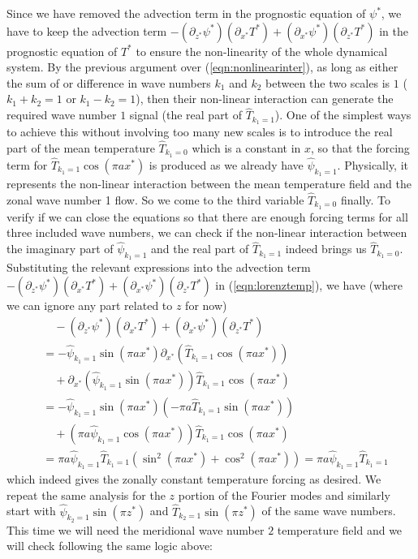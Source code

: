 Since we have removed the advection term in the prognostic equation of $\psi^*$, we have to keep the advection term $- (\partial_{z^*} \psi^*)(\partial_{x^*} T^*) + (\partial_{x^*} \psi^*)(\partial_{z^*} T^*)$ in the prognostic equation of $T^*$ to ensure the non-linearity of the whole dynamical system. By the previous argument over (\ref{eqn:nonlinearinter}), as long as either the sum of or difference in wave numbers $k_1$ and $k_2$ between the two scales is $1$ ($k_1 + k_2 = 1$ or $k_1 - k_2 = 1$), then their non-linear interaction can generate the required wave number $1$ signal (the real part of $\hat{T}_{k_1 = 1}$). One of the simplest ways to achieve this without involving too many new scales is to introduce the real part of the mean temperature $\hat{T}_{k_1 = 0}$ which is a constant in $x$, so that the forcing term for $\hat{T}_{k_1 = 1} \cos(\pi ax^*)$ is produced as we already have $\hat{\psi}_{k_1 = 1}$. Physically, it represents the non-linear interaction between the mean temperature field and the zonal wave number 1 flow. So we come to the third variable $\hat{T}_{k_1 = 0}$ finally. To verify if we can close the equations so that there are enough forcing terms for all three included wave numbers, we can check if the non-linear interaction between the imaginary part of $\hat{\psi}_{k_1 = 1}$ and the real part of $\hat{T}_{k_1 = 1}$ indeed brings us $\hat{T}_{k_1 = 0}$. Substituting the relevant expressions into the advection term $-(\partial_{z^*} \psi^*)(\partial_{x^*} T^*) + (\partial_{x^*} \psi^*)(\partial_{z^*} T^*)$ in (\ref{eqn:lorenztemp}), we have (where we can ignore any part related to $z$ for now)
\begin{align*}
&\quad -(\partial_{z^*} \psi^*)(\partial_{x^*} T^*) + (\partial_{x^*} \psi^*)(\partial_{z^*} T^*) \\
&= -\hat{\psi}_{k_1 = 1} \sin(\pi a x^*) \partial_{x^*} (\hat{T}_{k_1 = 1} \cos(\pi a x^*)) \\
&\quad + \partial_{x^*}(\hat{\psi}_{k_1 = 1} \sin(\pi a x^*))\hat{T}_{k_1 = 1} \cos(\pi a x^*) \\
&= -\hat{\psi}_{k_1 = 1} \sin(\pi a x^*)(-\pi a\hat{T}_{k_1 = 1}\sin(\pi a x^*)) \\
&\quad + (\pi a\hat{\psi}_{k_1 = 1}\cos(\pi a x^*)) \hat{T}_{k_1 = 1} \cos(\pi a x^*) \\
&= \pi a \hat{\psi}_{k_1 = 1}\hat{T}_{k_1 = 1}(\sin^2(\pi a x^*) + \cos^2(\pi a x^*)) = \pi a \hat{\psi}_{k_1 = 1}\hat{T}_{k_1 = 1}
\end{align*}
which indeed gives the zonally constant temperature forcing as desired. We repeat the same analysis for the $z$ portion of the Fourier modes and similarly start with  $\hat{\psi}_{k_2 = 1}\sin(\pi z^*)$ and $\hat{T}_{k_2 = 1} \sin(\pi z^*)$ of the same wave numbers. This time we will need the meridional wave number $2$ temperature field and we will check following the same logic above:
